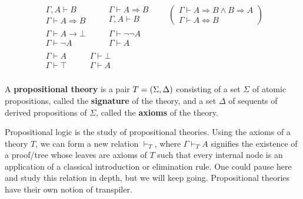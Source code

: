 \documentclass{../thesis-note}
\begin{document}
\begin{gather*}
  \begin{array}{c}
    \Gamma, A \vdash B \\\hline \Gamma \vdash A \Rightarrow B
  \end{array}\quad\quad
  \begin{array}{c}
    \Gamma \vdash A \Rightarrow B \\\hline \Gamma, A \vdash B
  \end{array}\quad\quad
  \left(
    \begin{array}{c}
      \Gamma \vdash A \Rightarrow B \wedge B \Rightarrow A \\\hline\hline \Gamma \vdash A
      \Leftrightarrow B
    \end{array}
  \right)\\
  \begin{array}{c}
    \Gamma \vdash A \to \bot \\\hline\hline \Gamma \vdash \neg A
  \end{array}\quad\quad
  \begin{array}{c}
    \Gamma \vdash \neg \neg A \\\hline \Gamma \vdash A
  \end{array}\\
  \begin{array}{c}
    \Gamma \vdash A \\\hline \Gamma \vdash \top
  \end{array}\quad\quad
  \begin{array}{c}
    \Gamma \vdash \bot \\\hline \Gamma \vdash A
  \end{array}\\
\end{gather*}
\begin{definition}
  A \textbf{propositional theory} is a pair \(T = {\left(\Sigma,\Delta\right)}\)
  consisting of a set \(\Sigma\) of atomic propositions, called the
  \textbf{signature} of the theory, and a set \(\Delta\) of sequents of derived
  propositions of \(\Sigma\), called the \textbf{axioms} of the theory.
\end{definition}
Propositional logic is the study of propositional theories. Using the axioms of
a theory \(T\), we can form a new relation \(\vdash_T\), where \(\Gamma \vdash_T
A\) signifies the existence of a proof\-/tree whose leaves are axioms of \(T\)
such that every internal node is an application of a classical introduction or
elimination rule. One could pause here and study this relation in depth, but we
will keep going. Propositional theories have their own notion of transpiler.
\end{document}
